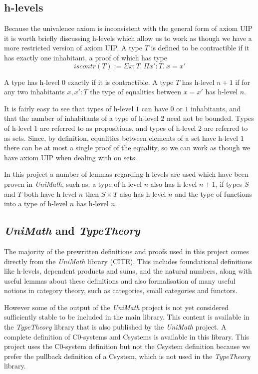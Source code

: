 \subsection{h-levels}
Because the univalence axiom is inconsistent with the general form of axiom UIP
it is worth briefly discussing h-levels which allow us to work as though we have
a more restricted version of axiom UIP. A type $T$ is defined to be contractible
if it has exactly one inhabitant, a proof of which has type
\[iscontr(T) := \Sigma x:T.\ \Pi x':T.\ x=x'\]

A type has h-level $0$ exactly if it is contractible. A type $T$ has h-level
$n+1$ if for any two inhabitants $x, x': T$ the type of equalities between
$x=x'$ has h-level $n$.

It is fairly easy to see that types of h-level $1$ can have $0$ or $1$
inhabitants, and that the number of inhabitants of a type of h-level $2$ need
not be bounded. Types of h-level $1$ are referred to as propositions, and types
of h-level $2$ are referred to as sets. Since, by definition, equalities between
elements of a set have h-level $1$ there can be at most a single proof of the
equality, so we can work as though we have axiom UIP when dealing with on sets.

In this project a number of lemmas regarding h-levels are used which have been
proven in \textit{UniMath}, such as: a type of h-level $n$ also has h-level
$n+1$, if types $S$ and $T$ both have h-level $n$ then $S\times T$ also has
h-level $n$ and the type of functions into a type of h-level $n$ has h-level
$n$.

\subsection{\textit{UniMath} and \textit{TypeTheory}}
The majority of the prewritten definitions and proofs used in this project comes
directly from the \textit{UniMath} library (CITE). This includes foundational
definitions like h-levels, dependent products and sums, and the natural numbers,
along with useful lemmas about these definitions and also formalisation of many
useful notions in category theory, such as categories, small categories and
functors.

However some of the output of the \textit{UniMath} project is not yet considered
sufficiently stable to be included in the main library. This content is
available in the \textit{TypeTheory} library that is also published by the
\textit{UniMath} project. A complete definition of C0-systems and Csystems is
available in this library. This project uses the C0-system definition but not
the Csystem definition because we prefer the pullback definition of a Csystem,
which is not used in the \textit{TypeTheory} library.